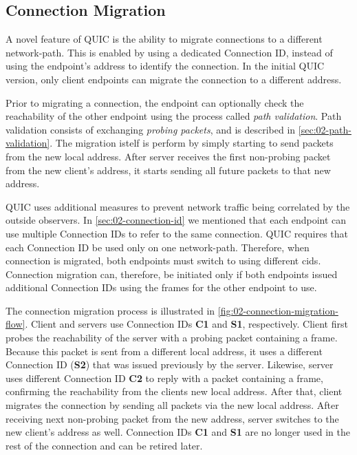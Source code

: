 \subsection{Connection Migration}


A novel feature of QUIC is the ability to migrate connections to a different \gls{network-path}.
This is enabled by using a dedicated Connection ID, instead of using the endpoint's address to
identify the connection. In the initial QUIC version, only client endpoints can migrate the
connection to a different address.

Prior to migrating a connection, the endpoint can optionally check the reachability of the other
endpoint using the process called \textit{path validation}. Path validation consists of exchanging
\textit{probing packets}, and is described in \autoref{sec:02-path-validation}. The migration istelf
is perform by simply starting to send packets from the new local address. After server receives the
first non-probing packet from the new client's address, it starts sending all future packets to that
new address.

QUIC uses additional measures to prevent network traffic being correlated by the outside observers.
In \autoref{sec:02-connection-id} we mentioned that each endpoint can use multiple Connection IDs to
refer to the same connection. QUIC requires that each Connection ID be used only on one
\gls{network-path}. Therefore, when connection is migrated, both endpoints must switch to using
different \glspl{cid}. Connection migration can, therefore, be initiated only if both endpoints
issued additional Connection IDs using the \NEWCONNECTIONID{} frames for the other endpoint to use.

The connection migration process is illustrated in \autoref{fig:02-connection-migration-flow}.
Client and servers use Connection IDs \textbf{C1} and \textbf{S1}, respectively. Client first probes
the reachability of the server with a probing packet containing a \PATHCHALLENGE{} frame. Because
this packet is sent from a different local address, it uses a different Connection ID (\textbf{S2})
that was issued previously by the server. Likewise, server uses different Connection ID \textbf{C2}
to reply with a packet containing a \PATHRESPONSE{} frame, confirming the reachability from the
clients new local address. After that, client migrates the connection by sending all packets via the
new local address. After receiving next non-probing packet from the new address, server switches to
the new client's address as well. Connection IDs \textbf{C1} and \textbf{S1} are no longer used in
the rest of the connection and can be retired later.

